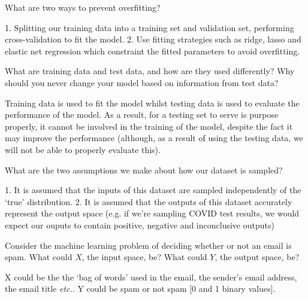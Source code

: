\begin{problem}[2]
  What are two ways to prevent overfitting?
\end{problem}
\begin{solution}
  1. Splitting our training data into a training set and validation set, performing cross-validation to fit the model.
  2. Use fitting strategies such as ridge, lasso and elastic net regression which constraint the fitted parameters to avoid overfitting.
\end{solution}

\begin{problem}[2]
  What are training data and test data, and how are they used differently? Why should you never change your model based on information from test data?
\end{problem}
\begin{solution}
  Training data is used to fit the model whilst testing data is used to evaluate the performance of the model. As a result, for a testing set to serve is purpose properly, it cannot be involved in the training of the model, despite the fact it may improve the performance (although, as a result of using the testing data, we will not be able to properly evaluate this).
\end{solution}

\begin{problem}[2]
  What are the two assumptions we make about how our dataset is sampled?
\end{problem}
\begin{solution}
  1. It is assumed that the inputs of this dataset are sampled independently of the `true' distribution. 
  2. It is assumed that the outputs of this dataset accurately represent the output space (e.g. if we're sampling COVID test results, we would expect our ouputs to contain positive, negative and inconclusive outputs)
\end{solution}

\begin{problem}[2]
  Consider the machine learning problem of deciding whether or not an email is spam. What could $X$, the input space, be? What could $Y$, the output space, be?
\end{problem}
\begin{solution}
  X could be the the `bag of words' used in the email, the sender's email address, the email title \textit{etc.}.
  Y could be spam or not spam [0 and 1 binary values].
\end{solution}

